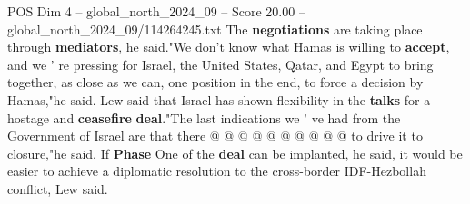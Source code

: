 \begin{textsample}{POS Dim 4 – global\_north\_2024\_09 – Score 20.00 – global\_north\_2024\_09/114264245.txt}
The \textbf{negotiations} are taking place through \textbf{mediators}, he said."We don't know what Hamas is willing to \textbf{accept}, and we ' re pressing for Israel, the United States, Qatar, and Egypt to bring together, as close as we can, one position in the end, to force a decision by Hamas,"he said.
Lew said that Israel has shown flexibility in the \textbf{talks} for a hostage and \textbf{ceasefire} \textbf{deal}."The last indications we ' ve had from the Government of Israel are that there @ @ @ @ @ @ @ @ @ @ to drive it to closure,"he said.
If \textbf{Phase} One of the \textbf{deal} can be implanted, he said, it would be easier to achieve a diplomatic resolution to the cross-border IDF-Hezbollah conflict, Lew said.

\end{textsample}

